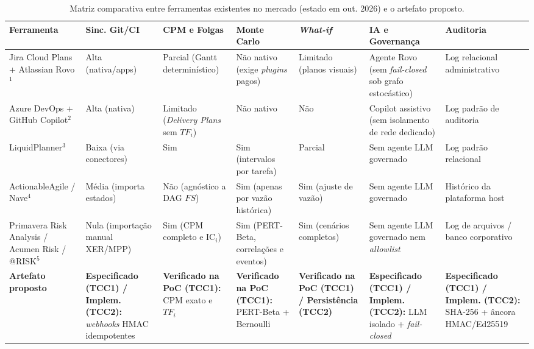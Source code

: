 \documentclass[12pt,openany,oneside,a4paper,english,brazilian,sumario=tradicional]{abntex2}
\newcommand{\IC}{\mathrm{IC}}
\begin{document}
\begin{table}[htbp]
\caption{Matriz comparativa entre ferramentas existentes no mercado (estado em out. 2026) e o artefato proposto.}\label{tab:ferramentas}
{\scriptsize
\setlength{\tabcolsep}{2.5pt}
\begin{tabularx}{\textwidth}{L{2.2cm} Y Y Y Y Y Y}
\toprule
\textbf{Ferramenta} & \textbf{Sinc. Git/CI} & \textbf{CPM e Folgas} & \textbf{Monte Carlo} & \textbf{\textit{What-if}} & \textbf{IA e Governança} & \textbf{Auditoria}\\
\midrule
Jira Cloud Plans + Atlassian Rovo$^1$ & Alta (nativa/\allowbreak apps) & Parcial (Gantt determinístico) & Não nativo (exige \textit{plugins} pagos) & Limitado (planos visuais) & Agente Rovo (sem \textit{fail-closed} sob grafo estocástico) & Log relacional administrativo\\
Azure DevOps + GitHub Copilot$^2$ & Alta (nativa) & Limitado (\textit{Delivery Plans} sem $TF_i$) & Não nativo & Não & Copilot assistivo (sem isolamento de rede dedicado) & Log padrão de auditoria\\
LiquidPlanner$^3$ & Baixa (via conectores) & Sim & Sim (intervalos por tarefa) & Parcial & Sem agente LLM governado & Log padrão relacional\\
ActionableAgile / Nave$^4$ & Média (importa estados) & Não (agnóstico a DAG $FS$) & Sim (apenas por vazão histórica) & Sim (ajuste de vazão) & Sem agente LLM governado & Histórico da plataforma host\\
Primavera Risk Analysis / Acumen Risk / @RISK$^5$ & Nula (importação manual XER/\allowbreak MPP) & Sim (CPM completo e $\IC_i$) & Sim (PERT-Beta, correlações e eventos) & Sim (cenários completos) & Sem agente LLM governado nem \textit{allowlist} & Log de arquivos / banco corporativo\\
\textbf{Artefato proposto} & \textbf{Especificado (TCC1) / Implem. (TCC2):} \textit{webhooks} HMAC idempotentes & \textbf{Verificado na PoC (TCC1):} CPM exato e $TF_i$ & \textbf{Verificado na PoC (TCC1):} PERT-Beta + Bernoulli & \textbf{Verificado na PoC (TCC1) / Persistência (TCC2)} & \textbf{Especificado (TCC1) / Implem. (TCC2):} LLM isolado + \textit{fail-closed} & \textbf{Especificado (TCC1) / Implem. (TCC2):} SHA-256 + âncora HMAC/\allowbreak Ed25519\\
\bottomrule
\end{tabularx}}
\par{}
\end{table}
\end{document}
